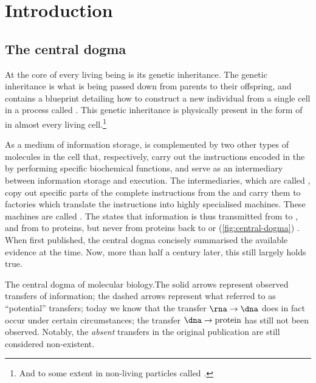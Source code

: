 \chapter{Introduction}


\section{The central dogma}

At the core of every living being is its genetic inheritance. The genetic
inheritance is what is being passed down from parents to their offspring, and
contains a blueprint detailing how to construct a new individual from a single
cell in a process called . This genetic inheritance is
physically present in the form of \dna in almost every living cell.\footnote{And
to some extent in non-living particles called .}

As a medium of information storage, \dna is complemented by two other types of
molecules in the cell that, respectively, carry out the instructions encoded in
the \dna by performing specific biochemical functions, and serve as an
intermediary between information storage and execution. The intermediaries,
which are called , copy out specific parts of the complete
instructions from the \dna and carry them to factories which translate the
instructions into highly specialised machines. These machines are called
. The  states that
information is thus transmitted from \dna to \rna, and from \rna to proteins,
but never from proteins back to \rna or \dna (\cref{fig:central-dogma})
\citep{Crick:1958,Crick:1970}. When first published, the central dogma concisely
summarised the available evidence at the time. Now, more than half a century
later, this still largely holds true.

    {The central dogma of molecular biology.}{The solid arrows represent
    observed transfers of information; the dashed arrows represent what
    \citet{Crick:1970} referred to as “potential” transfers; today we know that
    the transfer \(\text{\rna}\rightarrow\text{\dna}\) does in fact occur under
    certain circumstances; the transfer \(\text{\dna}\rightarrow\text{protein}\)
    has still not been observed. Notably, the \emph{absent} transfers in the
    original publication are still considered non-existent.}

